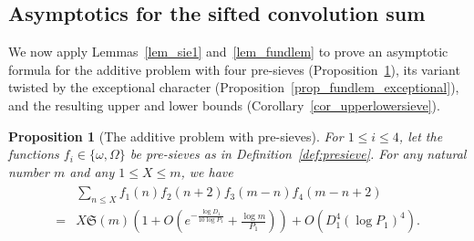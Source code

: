 \documentclass[12pt]{amsart}
\newtheorem{prop}[theorem]{Proposition}
\theoremstyle{definition}
\theoremstyle{remark}
\numberwithin{equation}{section}
\newcommand{\1}{\mathbf{1}}
\begin{document}
\subsection{Asymptotics for the sifted convolution sum}\label{subsec:6.2}
We now apply Lemmas~\ref{lem_sie1} and~\ref{lem_fundlem} to prove an asymptotic formula for the additive problem with four pre-sieves (Proposition~\ref{prop_presieveasmyp}), its variant twisted by the exceptional character (Proposition~\ref{prop_fundlem_exceptional}), and the resulting upper and lower bounds (Corollary~\ref{cor_upperlowersieve}).
\begin{prop}[The additive problem with pre-sieves]\label{prop_presieveasmyp}
    For $1\leq i \leq 4$, let the functions $f_i\in \{ \omega, \Omega \}$ be pre-sieves as in Definition~\ref{def:presieve}. For any natural number $m$ and any $1\leq X\leq m$, we have
    \begin{align}\label{eq_propsifted_asymptotics}\begin{aligned}
	   &\sum_{n\leq X} f_1(n)f_2(n+2) f_3(m-n)f_4(m-n+2)\\
       =& X \mathfrak{S}(m)\left(1+ O\left(e^{-\frac{\log D_1}{10 \log P_1}}+\frac{\log m}{P_1 }\right)\right)+O(D_1^4 (\log P_1)^4).
       \end{aligned}
	\end{align}
\end{prop}
	
\end{document}
